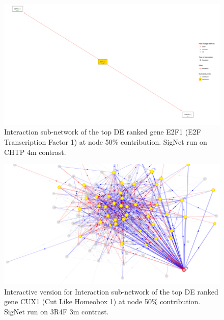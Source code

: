 \begin{figure}[!htbp]
    \centering
    \includegraphics[width=\textwidth, height=\textheight, keepaspectratio]{Major Thesis/figures/iut/graph/CHTP4m-E2F1.png}
    \caption{Interaction sub-network of the top DE ranked gene E2F1 (E2F Transcription Factor 1) at node 50\% contribution. SigNet run on CHTP 4m contrast.}
\end{figure}

\begin{figure}[!htbp]
    \centering
    \includegraphics[width=\textwidth, height=\textheight, keepaspectratio]{Major Thesis/figures/iut/graph/i3R4F-overall.png}
    \caption{Interactive version for Interaction sub-network of the top DE ranked gene CUX1 (Cut Like Homeobox 1) at node 50\% contribution. SigNet run on 3R4F 3m contrast.}
    \label{section:suppl:results:3R4F-interactive}
\end{figure}


